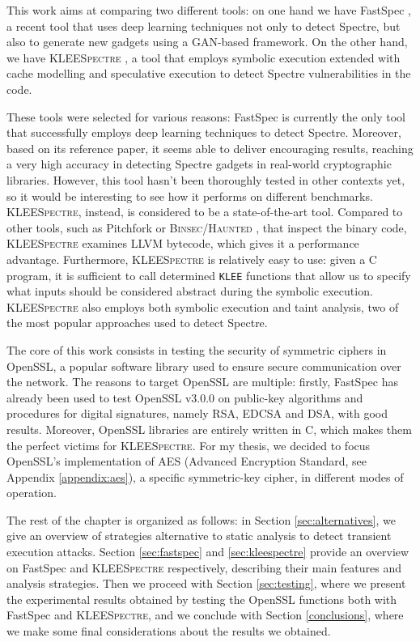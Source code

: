 \documentclass[12pt,a4paper]{book}
\theoremstyle{definition}
\begin{document}
	This work aims at comparing two different tools: on one hand we have FastSpec \cite{Tol2021}, a recent tool that uses deep learning techniques not only to detect Spectre, but also to generate new gadgets using a GAN-based framework. On the other hand, we have \textsc{\textsc{KLEE}Spectre} \cite{Wang2020}, a tool that employs symbolic execution extended with cache modelling and speculative execution to detect Spectre vulnerabilities in the code. 
	
	These tools were selected for various reasons: FastSpec is currently the only tool that successfully employs deep learning techniques to detect Spectre. Moreover, based on its reference paper, it seems able to deliver encouraging results, reaching a very high accuracy in detecting Spectre gadgets in real-world cryptographic libraries. However, this tool hasn't been thoroughly tested in other contexts yet, so it would be interesting to see how it performs on different benchmarks. \textsc{KLEESpectre}, instead, is considered to be a state-of-the-art tool. Compared to other tools, such as Pitchfork or \textsc{Binsec/Haunted} \cite{Daniel2021}, that inspect the binary code, \textsc{KLEESpectre} examines LLVM bytecode, which gives it a performance advantage. Furthermore, \textsc{KLEESpectre} is relatively easy to use: given a C program, it is sufficient to call determined \texttt{KLEE} functions that allow us to specify what inputs should be considered abstract during the symbolic execution. \textsc{KLEESpectre} also employs both symbolic execution and taint analysis, two of the most popular approaches used to detect Spectre.
	
	The core of this work consists in testing the security of symmetric ciphers in OpenSSL, a popular software library used to ensure secure communication over the network. The reasons to target OpenSSL are multiple: firstly, FastSpec has already been used to test OpenSSL v3.0.0 on public-key algorithms and procedures for digital signatures, namely RSA, EDCSA and DSA, with good results. Moreover, OpenSSL libraries are entirely written in C, which makes them the perfect victims for \textsc{KLEESpectre}. For my thesis, we decided to focus OpenSSL's implementation of AES (Advanced Encryption Standard, see Appendix \ref{appendix:aes}), a specific symmetric-key cipher, in different modes of operation. 
	
	The rest of the chapter is organized as follows: in Section \ref{sec:alternatives}, we give an overview of strategies alternative to static analysis to detect transient execution attacks. Section \ref{sec:fastspec} and \ref{sec:kleespectre} provide an overview on FastSpec and \textsc{KLEESpectre} respectively, describing their main features and analysis strategies. Then we proceed with Section \ref{sec:testing}, where we present the experimental results obtained by testing the OpenSSL functions both with FastSpec and \textsc{KLEESpectre}, and we conclude with Section \ref{conclusions}, where we make some final considerations about the results we obtained. 
	
\end{document}
